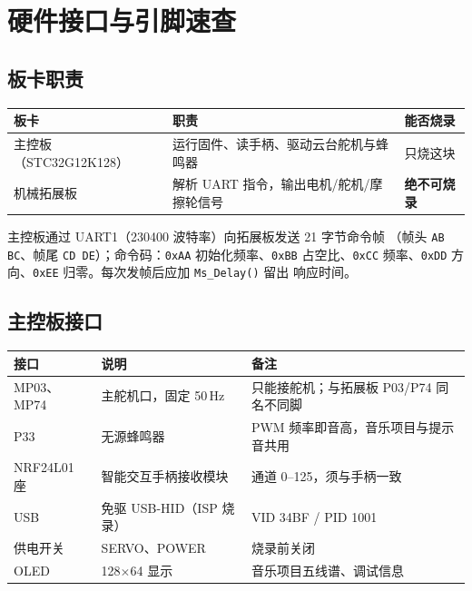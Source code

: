 
\chapter{硬件接口与引脚速查}
\label{app:hw}

\section{板卡职责}

\begin{center}
\begin{tabular}{@{}lll@{}}
\toprule
板卡 & 职责 & 能否烧录 \\
\midrule
主控板（STC32G12K128） & 运行固件、读手柄、驱动云台舵机与蜂鸣器 & 只烧这块 \\
机械拓展板 & 解析 UART 指令，输出电机/舵机/摩擦轮信号 & \textbf{绝不可烧录} \\
\bottomrule
\end{tabular}
\end{center}

主控板通过 UART1（230400 波特率）向拓展板发送 21 字节命令帧
（帧头 \texttt{AB BC}、帧尾 \texttt{CD DE}）；命令码：\texttt{0xAA}
初始化频率、\texttt{0xBB} 占空比、\texttt{0xCC} 频率、\texttt{0xDD}
方向、\texttt{0xEE} 归零。每次发帧后应加 \texttt{Ms\_Delay()} 留出
响应时间。

\section{主控板接口}

\begin{center}
\begin{tabular}{@{}lll@{}}
\toprule
接口 & 说明 & 备注 \\
\midrule
MP03、MP74 & 主舵机口，固定 50\,Hz & 只能接舵机；与拓展板 P03/P74 同名不同脚 \\
P33 & 无源蜂鸣器 & PWM 频率即音高，音乐项目与提示音共用 \\
NRF24L01 座 & 智能交互手柄接收模块 & 通道 0--125，须与手柄一致 \\
USB & 免驱 USB-HID（ISP 烧录） & VID 34BF / PID 1001 \\
供电开关 & SERVO、POWER & 烧录前关闭 \\
OLED & 128$\times$64 显示 & 音乐项目五线谱、调试信息 \\
\bottomrule
\end{tabular}
\end{center}

